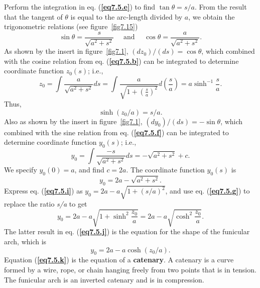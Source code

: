 \documentclass{AeroStructure-ERJohnson}
\begin{document}
\begin{example}
\noindent Perform the integration in eq. (\textbf{\ref{eq7.5.e}}) to find $\tan \theta=s/a$. From the result that the tangent of $\theta$ is equal to the arc-length divided by $a$, we obtain the trigonometric relations (see figure~\ref{fig7.15})
\begin{equation}
\sin \theta=\frac{s}{\sqrt{a^{2}+s^{2}}} \quad \text { and } \quad \cos \theta=\frac{a}{\sqrt{a^{2}+s^{2}}}. \label{eq7.5.f}\tag{f}
\end{equation}
As shown by the insert in figure~\ref{fig7.1}, $\left(d z_{0}\right) /(d s)=\cos \theta$, which combined with the cosine relation from eq. (\textbf{\ref{eq7.5.b}}) can be integrated to determine coordinate function $z_{0}(s)$; i.e.,
\begin{equation*}
z_{0}=\int \frac{a}{\sqrt{a^{2}+s^{2}}} d s=\int \frac{a}{\sqrt{1+\left(\frac{s}{a}\right)^{2}}} d\left(\frac{s}{a}\right)=a \sinh ^{-1} \frac{s}{a}.
\end{equation*}
Thus,
\begin{equation}
\sinh \left(z_{0} / a\right)=s / a. \label{eq7.5.g}\tag{g}
\end{equation}
Also as shown by the insert in figure~\ref{fig7.1}, $\left(d y_{0}\right) /(d s)=-\sin \theta$, which combined with the sine relation from eq. (\textbf{\ref{eq7.5.f}}) can be integrated to determine coordinate function $y_{0}(s)$; i.e.,
\begin{equation}
y_{0}=\int \frac{-s}{\sqrt{a^{2}+s^{2}}} d s=-\sqrt{a^{2}+s^{2}}+c. \label{eq7.5.h}\tag{h}
\end{equation}
We specify $y_{0}(0)=a$, and find $c=2 a$. The coordinate function $y_{0}(s)$ is
\begin{equation}
y_{0}=2 a-\sqrt{a^{2}+s^{2}}. \label{eq7.5.i}\tag{i}
\end{equation}
Express eq. (\textbf{\ref{eq7.5.i}}) as $y_{0}=2 a-a \sqrt{1+(s / a)^{2}}$, and use eq. (\textbf{\ref{eq7.5.g}}) to replace the ratio \textit{s/a} to get
\begin{equation}
y_{0}=2 a-a \sqrt{1+\sinh ^{2} \frac{z_{0}}{a}}=2 a-a \sqrt{\cosh ^{2} \frac{z_{0}}{a}}. \label{eq7.5.j}\tag{j}
\end{equation}
The latter result in eq. (\textbf{\ref{eq7.5.j}}) is the equation for the shape of the funicular arch, which is
\begin{equation}
y_{0}=2 a-a \cosh \left(z_{0} / a\right). \label{eq7.5.k}\tag{k}
\end{equation}
Equation (\textbf{\ref{eq7.5.k}}) is the equation of a \textbf{catenary}. A catenary is a curve formed by a wire, rope, or chain hanging freely from two points that is in tension. The funicular arch is an inverted catenary and is in compression.




\end{example}
\end{document}
